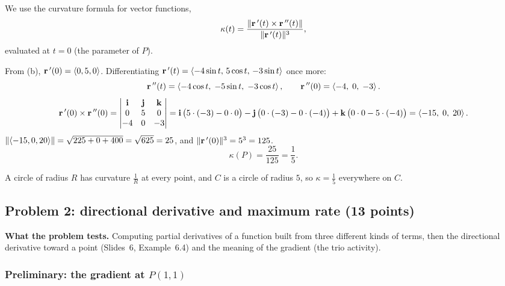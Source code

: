 We use the curvature formula for vector functions,
\[
  \kappa(t)=\frac{\lVert\mathbf{r}\,'(t)\times\mathbf{r}\,''(t)\rVert}{\lVert\mathbf{r}\,'(t)\rVert^3},
\]
evaluated at $t=0$ (the parameter of $P$).

 From (b), $\mathbf{r}\,'(0)=\left\langle 0,5,0 \right\rangle$.
 Differentiating $\mathbf{r}\,'(t)=\left\langle -4\sin t,\,5\cos t,\,-3\sin t \right\rangle$ once more:
\[
  \mathbf{r}\,''(t)=\left\langle -4\cos t,\;-5\sin t,\;-3\cos t \right\rangle,\qquad\mathbf{r}\,''(0)=\left\langle -4,\;0,\;-3 \right\rangle.
\]
\[
  \mathbf{r}\,'(0)\times\mathbf{r}\,''(0)=\begin{vmatrix}\mathbf{i}&\mathbf{j}&\mathbf{k}\\0&5&0\\-4&0&-3\end{vmatrix}
  =\mathbf{i}\,\big(5\cdot(-3)-0\cdot0\big)-\mathbf{j}\,\big(0\cdot(-3)-0\cdot(-4)\big)+\mathbf{k}\,\big(0\cdot0-5\cdot(-4)\big)
  =\left\langle -15,\;0,\;20 \right\rangle.
\]
 $\lVert\left\langle -15,0,20 \right\rangle\rVert=\sqrt{225+0+400}=\sqrt{625}=25$, and
$\lVert\mathbf{r}\,'(0)\rVert^3=5^3=125$.
\[
  \kappa(P)=\frac{25}{125}=\boxed{\frac15}.
\]

\begin{altmethod}
A circle of radius $R$ has curvature $\frac1R$ at every point, and $C$ is a circle
of radius $5$, so $\kappa=\frac15$ everywhere on $C$.
\end{altmethod}


\subsection{Problem 2: directional derivative and maximum rate (13 points)}

\textbf{What the problem tests.} Computing partial derivatives of a function
built from three different kinds of terms, then the directional derivative
toward a point (Slides~6, Example~6.4) and the meaning of the gradient (the trio
activity).

\subsubsection*{Preliminary: the gradient at $P(1,1)$}

